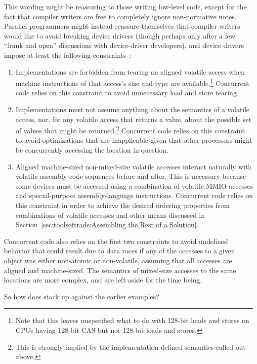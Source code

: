 This wording might be reassuring to those writing low-level code, except
for the fact that compiler writers are free to completely ignore
non-normative notes.
Parallel programmers might instead reassure themselves that compiler
writers would like to avoid breaking device drivers (though perhaps
only after a few ``frank and open'' discussions with device-driver
developers), and device drivers impose at least the following
constraints~\cite{PaulEMcKenney2016P0124R6-LKMM}:

\begin{enumerate}
\item	Implementations are forbidden from tearing an aligned volatile
	access when machine instructions of that access's size and type
	are available.\footnote{
		Note that this leaves unspecified what to do with 128-bit
		loads and stores on CPUs having 128-bit CAS but not
		128-bit loads and stores.}
	Concurrent code relies on this constraint to avoid unnecessary
	load and store tearing.
\item	Implementations must not assume anything about the semantics of
	a volatile access, nor, for any volatile access that returns a
	value, about the possible set of values that might be
	returned.\footnote{
		This is strongly implied by the implementation-defined
		semantics called out above.}
	Concurrent code relies on this constraint to avoid optimizations
	that are inapplicable given that other processors might be
	concurrently accessing the location in question.
\item	Aligned machine-sized non-mixed-size volatile accesses interact
	naturally with volatile assembly-code sequences before and after.
	This is necessary because some devices must be accessed using
	a combination of volatile MMIO accesses and special-purpose
	assembly-language instructions.
	Concurrent code relies on this constraint in order to achieve
	the desired ordering properties from combinations of volatile
	accesses and other means discussed in
	Section~\ref{sec:toolsoftrade:Assembling the Rest of a Solution}.
\end{enumerate}

Concurrent code also relies on the first two constraints to avoid
undefined behavior that could result due to data races if any of the
accesses to a given object was either non-atomic or non-volatile,
assuming that all accesses are aligned and machine-sized.
The semantics of mixed-size accesses to the same locations are more
complex, and are left aside for the time being.

So how does  stack up against the earlier examples?


